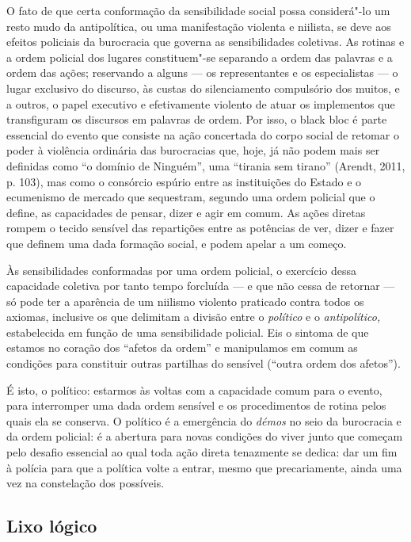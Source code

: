 O fato de que certa conformação da sensibilidade social possa
considerá"-lo um resto mudo da antipolítica, ou uma manifestação violenta
e niilista, se deve aos efeitos policiais da burocracia que governa as
sensibilidades coletivas. As rotinas e a ordem policial dos lugares
constituem"-se separando a ordem das palavras e a ordem das ações;
reservando a alguns --- os representantes e os especialistas --- o lugar
exclusivo do discurso, às custas do silenciamento compulsório dos
muitos, e a outros, o papel executivo e efetivamente violento de atuar
os implementos que transfiguram os discursos em palavras de ordem. Por
isso, o black bloc é parte essencial do evento que consiste na
ação concertada do corpo social de retomar o poder à violência ordinária
das burocracias que, hoje, já não podem mais ser definidas como ``o
domínio de Ninguém'', uma ``tirania sem tirano'' (Arendt, 2011, p. 103),
mas como o consórcio espúrio entre as instituições do Estado e o
ecumenismo de mercado que sequestram, segundo uma ordem policial que o
define, as capacidades de pensar, dizer e agir em comum. As ações
diretas rompem o tecido sensível das repartições entre as potências de
ver, dizer e fazer que definem uma dada formação social, e podem apelar
a um começo.

Às sensibilidades conformadas por uma ordem policial, o exercício dessa
capacidade coletiva por tanto tempo forcluída --- e que não cessa de
retornar --- só pode ter a aparência de um niilismo violento praticado
contra todos os axiomas, inclusive os que delimitam a divisão entre o
\emph{político }e o\emph{ antipolítico,} estabelecida em função de uma
sensibilidade policial. Eis o sintoma de que estamos no coração dos
``afetos da ordem'' e manipulamos em comum as condições para constituir
outras partilhas do sensível (``outra ordem dos afetos'').

É isto, o político: estarmos às voltas com a capacidade comum para o
evento, para interromper uma dada ordem sensível e os procedimentos de
rotina pelos quais ela se conserva. O político é a emergência do
\emph{démos} no seio da burocracia e da ordem policial: é a abertura
para novas condições do viver junto que começam pelo desafio essencial
ao qual toda ação direta tenazmente se dedica: dar um fim à polícia para
que a política volte a entrar, mesmo que precariamente, ainda uma vez na
constelação dos possíveis.

\subsection{Lixo lógico}

